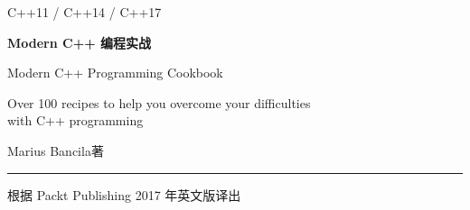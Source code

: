 \thispagestyle{empty}
\begingroup
\centering
\vspace*{2.4cm}

{\sffamily\fontsize{11bp}{14bp}\selectfont C++11 / C++14 / C++17\par}
\vspace{14bp}

{\sffamily\fontsize{33bp}{40bp}\selectfont\bfseries Modern C++ 编程实战\par}
\vspace{18bp}

{\fontsize{13.5bp}{19bp}\selectfont Modern C++ Programming Cookbook\par}
\vspace{4bp}
{\fontsize{11.5bp}{16bp}\selectfont Over 100 recipes to help you overcome your difficulties\\ with C++ programming\par}

\vspace{54bp}
{\sffamily\fontsize{12bp}{17bp}\selectfont Marius Bancila\quad 著\par}

\vfill
{\color{ink}\rule{0.55\textwidth}{0.5bp}\par}
\vspace{12bp}
{\sffamily\fontsize{10.5bp}{15bp}\selectfont 根据 Packt Publishing 2017 年英文版译出\par}
\vspace{1.4cm}
\endgroup
\clearpage
